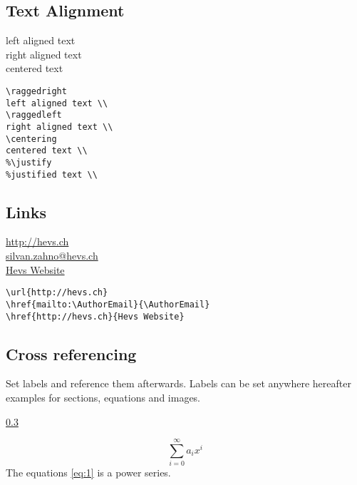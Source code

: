 \documentclass[a4paper,11pt,fleqn]{book}
\makeatletter
\newcommand{\AuthorEmail}{silvan.zahno@hevs.ch}
\makeatother
\begin{document}
\begin{enumerate}
\subsection{Text Alignment}
\begin{multicols}{2}
  \raggedright
  left aligned text \\
  \raggedleft
  right aligned text \\
  \centering
  centered text \\

  \vfill\null\columnbreak

  \begin{verbatim}
\raggedright
left aligned text \\
\raggedleft
right aligned text \\
\centering
centered text \\
%\justify
%justified text \\
  \end{verbatim}
\end{multicols}

\subsection{Links}
\begin{multicols}{2}
  \url{http://hevs.ch} \\
  \href{mailto:\AuthorEmail}{\AuthorEmail} \\
  \href{http://hevs.ch}{Hevs Website}

  \vfill\null\columnbreak

  \begin{verbatim}
\url{http://hevs.ch}
\href{mailto:\AuthorEmail}{\AuthorEmail}
\href{http://hevs.ch}{Hevs Website}
  \end{verbatim}
\end{multicols}

\subsection{Cross referencing} \label{sec:crossref}
Set labels and reference them afterwards. Labels can be set anywhere hereafter examples for sections, equations and images.

\ref{sec:crossref} 

\begin{equation} \label{eq:1}
  \sum_{i=0}^{\infty} a_i x^i
\end{equation}
The equations \ref{eq:1} is a power series.


\end{enumerate}
\end{document}
